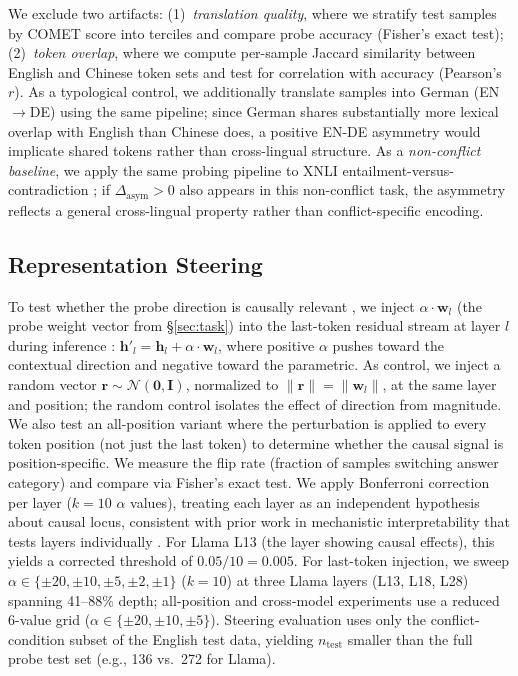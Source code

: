 We exclude two artifacts: (1)~\emph{translation quality}, where we stratify test samples by COMET score into terciles and compare probe accuracy (Fisher's exact test); (2)~\emph{token overlap}, where we compute per-sample Jaccard similarity between English and Chinese token sets and test for correlation with accuracy (Pearson's $r$).
As a typological control, we additionally translate samples into German (EN$\to$DE) using the same pipeline; since German shares substantially more lexical overlap with English than Chinese does, a positive EN-DE asymmetry would implicate shared tokens rather than cross-lingual structure.
As a \emph{non-conflict baseline}, we apply the same probing pipeline to XNLI entailment-versus-contradiction \citep{conneau2018xnli}; if $\Delta_{\text{asym}} > 0$ also appears in this non-conflict task, the asymmetry reflects a general cross-lingual property rather than conflict-specific encoding.

\subsection{Representation Steering}
\label{sec:steering_method}

To test whether the probe direction is causally relevant \citep{hewitt2019designing}, we inject $\alpha \cdot \mathbf{w}_l$ (the probe weight vector from \S\ref{sec:task}) into the last-token residual stream at layer $l$ during inference \citep{li2023iti, zou2023representation}:
$\mathbf{h}'_l = \mathbf{h}_l + \alpha \cdot \mathbf{w}_l$,
where positive $\alpha$ pushes toward the contextual direction and negative toward the parametric.
As control, we inject a random vector $\mathbf{r} \sim \mathcal{N}(\mathbf{0}, \mathbf{I})$, normalized to $\|\mathbf{r}\| = \|\mathbf{w}_l\|$, at the same layer and position; the random control isolates the effect of direction from magnitude.
We also test an all-position variant where the perturbation is applied to every token position (not just the last token) to determine whether the causal signal is position-specific.
We measure the flip rate (fraction of samples switching answer category) and compare via Fisher's exact test.
We apply Bonferroni correction per layer ($k = 10$ $\alpha$ values), treating each layer as an independent hypothesis about causal locus, consistent with prior work in mechanistic interpretability that tests layers individually \citep{meng2022locating, geiger2024finding}.
For Llama L13 (the layer showing causal effects), this yields a corrected threshold of $0.05/10 = 0.005$.
For last-token injection, we sweep $\alpha \in \{\pm 20, \pm 10, \pm 5, \pm 2, \pm 1\}$ ($k = 10$) at three Llama layers (L13, L18, L28) spanning 41--88\% depth; all-position and cross-model experiments use a reduced 6-value grid ($\alpha \in \{\pm 20, \pm 10, \pm 5\}$).
Steering evaluation uses only the conflict-condition subset of the English test data, yielding $n_{\text{test}}$ smaller than the full probe test set (e.g., 136 vs.\ 272 for Llama).